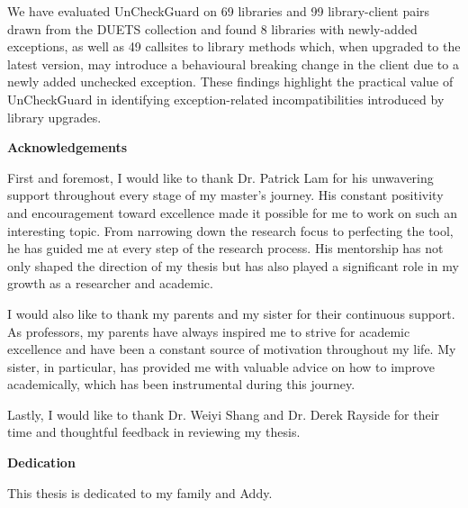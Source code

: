       We have evaluated UnCheckGuard on 69 libraries and 99 library-client pairs drawn from the DUETS collection
      and found 8 libraries with newly-added exceptions, as well as 49 callsites to library methods which,
      when upgraded to the latest version, may introduce
      a behavioural breaking change in the client due to a newly added unchecked exception. These findings
      highlight the practical value of UnCheckGuard in identifying exception-related incompatibilities
      introduced by library upgrades.

\cleardoublepage
{}    %

\begin{center}\textbf{Acknowledgements}\end{center}

First and foremost, I would like to thank Dr. Patrick Lam for his unwavering support throughout every stage of my master's journey. His constant positivity and encouragement toward excellence made it possible for me to work on such an interesting topic. From narrowing down the research focus to perfecting the tool, he has guided me at every step of the research process. His mentorship has not only shaped the direction of my thesis but has also played a significant role in my growth as a researcher and academic.

I would also like to thank my parents and my sister for their continuous support. As professors, my parents have always inspired me to strive for academic excellence and have been a constant source of motivation throughout my life. My sister, in particular, has provided me with valuable advice on how to improve academically, which has been instrumental during this journey.

Lastly, I would like to thank Dr. Weiyi Shang and Dr. Derek Rayside for their time and thoughtful feedback in reviewing my thesis.
\cleardoublepage
{}    %


\begin{center}\textbf{Dedication}\end{center}
This thesis is dedicated to my family and Addy.
\cleardoublepage
{}    %



